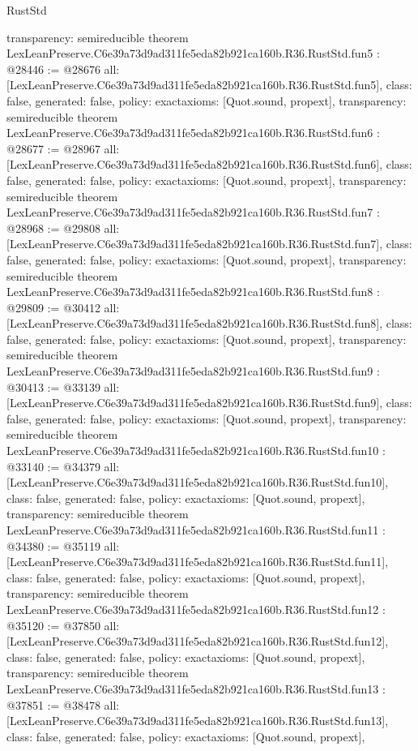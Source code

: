 \begin{lexlean}{RustStd}
\begin{coremodule}
{  transparency: semireducible
}
theorem LexLeanPreserve.C6e39a73d9ad311fe5eda82b921ca160b.R36.RustStd.fun5 : @28446 := @28676 {
  all: [LexLeanPreserve.C6e39a73d9ad311fe5eda82b921ca160b.R36.RustStd.fun5],
  class: false,
  generated: false,
  policy: exact{axioms: [Quot.sound, propext]},
  transparency: semireducible
}
theorem LexLeanPreserve.C6e39a73d9ad311fe5eda82b921ca160b.R36.RustStd.fun6 : @28677 := @28967 {
  all: [LexLeanPreserve.C6e39a73d9ad311fe5eda82b921ca160b.R36.RustStd.fun6],
  class: false,
  generated: false,
  policy: exact{axioms: [Quot.sound, propext]},
  transparency: semireducible
}
theorem LexLeanPreserve.C6e39a73d9ad311fe5eda82b921ca160b.R36.RustStd.fun7 : @28968 := @29808 {
  all: [LexLeanPreserve.C6e39a73d9ad311fe5eda82b921ca160b.R36.RustStd.fun7],
  class: false,
  generated: false,
  policy: exact{axioms: [Quot.sound, propext]},
  transparency: semireducible
}
theorem LexLeanPreserve.C6e39a73d9ad311fe5eda82b921ca160b.R36.RustStd.fun8 : @29809 := @30412 {
  all: [LexLeanPreserve.C6e39a73d9ad311fe5eda82b921ca160b.R36.RustStd.fun8],
  class: false,
  generated: false,
  policy: exact{axioms: [Quot.sound, propext]},
  transparency: semireducible
}
theorem LexLeanPreserve.C6e39a73d9ad311fe5eda82b921ca160b.R36.RustStd.fun9 : @30413 := @33139 {
  all: [LexLeanPreserve.C6e39a73d9ad311fe5eda82b921ca160b.R36.RustStd.fun9],
  class: false,
  generated: false,
  policy: exact{axioms: [Quot.sound, propext]},
  transparency: semireducible
}
theorem LexLeanPreserve.C6e39a73d9ad311fe5eda82b921ca160b.R36.RustStd.fun10 : @33140 := @34379 {
  all: [LexLeanPreserve.C6e39a73d9ad311fe5eda82b921ca160b.R36.RustStd.fun10],
  class: false,
  generated: false,
  policy: exact{axioms: [Quot.sound, propext]},
  transparency: semireducible
}
theorem LexLeanPreserve.C6e39a73d9ad311fe5eda82b921ca160b.R36.RustStd.fun11 : @34380 := @35119 {
  all: [LexLeanPreserve.C6e39a73d9ad311fe5eda82b921ca160b.R36.RustStd.fun11],
  class: false,
  generated: false,
  policy: exact{axioms: [Quot.sound, propext]},
  transparency: semireducible
}
theorem LexLeanPreserve.C6e39a73d9ad311fe5eda82b921ca160b.R36.RustStd.fun12 : @35120 := @37850 {
  all: [LexLeanPreserve.C6e39a73d9ad311fe5eda82b921ca160b.R36.RustStd.fun12],
  class: false,
  generated: false,
  policy: exact{axioms: [Quot.sound, propext]},
  transparency: semireducible
}
theorem LexLeanPreserve.C6e39a73d9ad311fe5eda82b921ca160b.R36.RustStd.fun13 : @37851 := @38478 {
  all: [LexLeanPreserve.C6e39a73d9ad311fe5eda82b921ca160b.R36.RustStd.fun13],
  class: false,
  generated: false,
  policy: exact{axioms: [Quot.sound, propext]},
}
\end{coremodule}
\end{lexlean}
